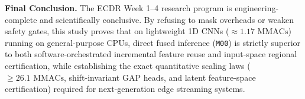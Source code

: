 \documentclass[11pt,a4paper]{article}
\newcommand{\code}[1]{{\small\ttfamily\nolinkurl{#1}}}
\theoremstyle{remark}
\begin{document}
\textbf{Final Conclusion.} The ECDR Week 1--4 research program is engineering-complete and scientifically conclusive. By refusing to mask overheads or weaken safety gates, this study proves that on lightweight 1D CNNs ($\approx 1.17\text{ MMACs}$) running on general-purpose CPUs, direct fused inference (\code{M00}) is strictly superior to both software-orchestrated incremental feature reuse and input-space regional certification, while establishing the exact quantitative scaling laws ($\ge 26.1\text{ MMACs}$, shift-invariant GAP heads, and latent feature-space certification) required for next-generation edge streaming systems.
\end{document}
